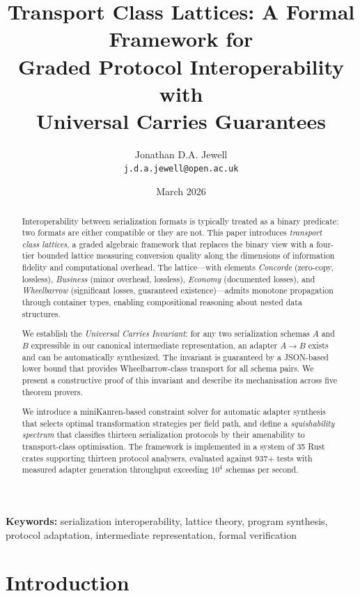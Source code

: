 \documentclass[11pt,a4paper]{article}
\title{%
  Transport Class Lattices: A Formal Framework for\\
  Graded Protocol Interoperability with\\
  Universal Carries Guarantees%
}
\author{%
  Jonathan D.A. Jewell\\
  \texttt{j.d.a.jewell@open.ac.uk}%
}
\date{March 2026}
\theoremstyle{definition}
\theoremstyle{remark}
\begin{document}
\maketitle

\begin{abstract}
Interoperability between serialization formats is typically treated as a
binary predicate: two formats are either compatible or they are not. This
paper introduces \emph{transport class lattices}, a graded algebraic
framework that replaces the binary view with a four-tier bounded lattice
measuring conversion quality along the dimensions of information fidelity
and computational overhead. The lattice---with elements
\emph{Concorde} (zero-copy, lossless), \emph{Business} (minor overhead,
lossless), \emph{Economy} (documented losses), and
\emph{Wheelbarrow} (significant losses, guaranteed existence)---admits
monotone propagation through container types, enabling compositional
reasoning about nested data structures.

We establish the \emph{Universal Carries Invariant}: for any two
serialization schemas $A$ and $B$ expressible in our canonical
intermediate representation, an adapter $A \to B$ exists and can be
automatically synthesized. The invariant is guaranteed by a JSON-based
lower bound that provides Wheelbarrow-class transport for all schema
pairs. We present a constructive proof of this invariant and describe its
mechanisation across five theorem provers.

We introduce a miniKanren-based constraint solver for automatic adapter
synthesis that selects optimal transformation strategies per field path,
and define a \emph{squishability spectrum} that classifies thirteen
serialization protocols by their amenability to transport-class
optimisation. The framework is implemented in a system of 35 Rust
crates supporting thirteen protocol analysers, evaluated against 937+
tests with measured adapter generation throughput exceeding $10^4$
schemas per second.
\end{abstract}

\vspace{1em}
\noindent\textbf{Keywords:} serialization interoperability, lattice theory,
program synthesis, protocol adaptation, intermediate representation,
formal verification

\section{Introduction}\label{sec:intro}
\end{document}
